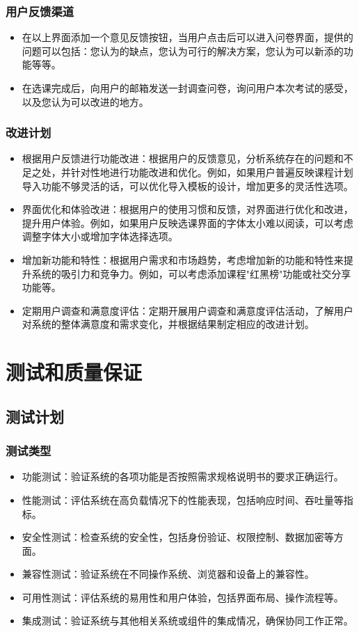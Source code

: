\documentclass{article}
\begin{document}
\subsubsection{用户反馈渠道}
\begin{itemize}
	\item 在以上界面添加一个意见反馈按钮，当用户点击后可以进入问卷界面，提供的问题可以包括：您认为的缺点，您认为可行的解决方案，您认为可以新添的功能等等。
	\item 在选课完成后，向用户的邮箱发送一封调查问卷，询问用户本次考试的感受，以及您认为可以改进的地方。
\end{itemize}

\subsubsection{改进计划}
\begin{itemize}
	\item 根据用户反馈进行功能改进：根据用户的反馈意见，分析系统存在的问题和不足之处，并针对性地进行功能改进和优化。例如，如果用户普遍反映课程计划导入功能不够灵活的话，可以优化导入模板的设计，增加更多的灵活性选项。
	\item 界面优化和体验改进：根据用户的使用习惯和反馈，对界面进行优化和改进，提升用户体验。例如，如果用户反映选课界面的字体太小难以阅读，可以考虑调整字体大小或增加字体选择选项。
	\item 增加新功能和特性：根据用户需求和市场趋势，考虑增加新的功能和特性来提升系统的吸引力和竞争力。例如，可以考虑添加课程"红黑榜"功能或社交分享功能等。
	\item 定期用户调查和满意度评估：定期开展用户调查和满意度评估活动，了解用户对系统的整体满意度和需求变化，并根据结果制定相应的改进计划。
\end{itemize}

\section{测试和质量保证}
\subsection{测试计划}
\subsubsection{测试类型}
\begin{itemize}
	\item 功能测试：验证系统的各项功能是否按照需求规格说明书的要求正确运行。
	\item 性能测试：评估系统在高负载情况下的性能表现，包括响应时间、吞吐量等指标。
	\item 安全性测试：检查系统的安全性，包括身份验证、权限控制、数据加密等方面。
	\item 兼容性测试：验证系统在不同操作系统、浏览器和设备上的兼容性。
	\item 可用性测试：评估系统的易用性和用户体验，包括界面布局、操作流程等。
	\item 集成测试：验证系统与其他相关系统或组件的集成情况，确保协同工作正常。
\end{itemize}
	
\end{document}
